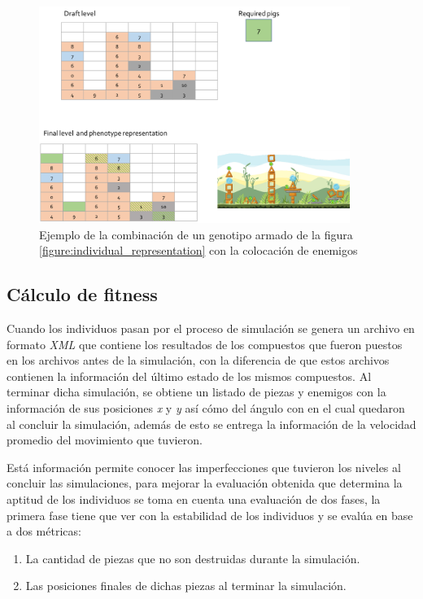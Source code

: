 \begin{figure}
  \centering
  \includegraphics[width=0.9\textwidth]{img/layer123_combine.png}
  \caption{Ejemplo de la combinación de un genotipo armado de la figura \ref{figure:individual_representation} con la colocación de enemigos}
  \label{figure:ind_representation_plus_pigs}
\end{figure}

\subsection{Cálculo de fitness}
\label{subsection:fitness_calculation}

Cuando los individuos pasan por el proceso de simulación se genera un archivo en
formato \textit{XML} que contiene los resultados de los compuestos que fueron
puestos en los archivos antes de la simulación, con la diferencia de que estos
archivos contienen la información del último estado de los mismos compuestos. Al
terminar dicha simulación, se obtiene un listado de piezas y enemigos con
la información de sus posiciones \textit{x} y \textit{y} así cómo del ángulo con
en el cual quedaron al concluir la simulación, además de esto se entrega la
información de la velocidad promedio del movimiento que tuvieron.

Está información permite conocer las imperfecciones que tuvieron los niveles al
concluir las simulaciones, para mejorar la evaluación obtenida que determina la
aptitud de los individuos se toma en cuenta una evaluación de dos fases, la
primera fase tiene que ver con la estabilidad de los individuos y se evalúa en
base a dos métricas:
\begin{enumerate}
    \item La cantidad de piezas que no son destruidas durante la simulación.
    \item Las posiciones finales de dichas piezas al terminar la simulación.
\end{enumerate}


